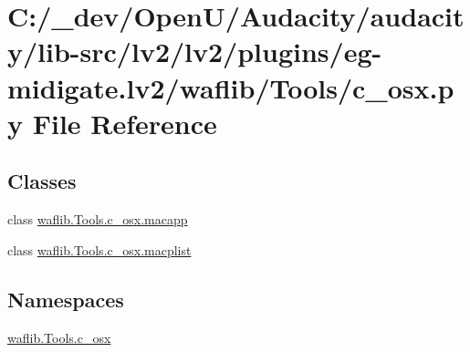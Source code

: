 \hypertarget{lv2_2plugins_2eg-midigate_8lv2_2waflib_2_tools_2c__osx_8py}{}\section{C\+:/\+\_\+dev/\+Open\+U/\+Audacity/audacity/lib-\/src/lv2/lv2/plugins/eg-\/midigate.lv2/waflib/\+Tools/c\+\_\+osx.py File Reference}
\label{lv2_2plugins_2eg-midigate_8lv2_2waflib_2_tools_2c__osx_8py}
\subsection*{Classes}
\begin{DoxyCompactItemize}
\item 
class \hyperlink{classwaflib_1_1_tools_1_1c__osx_1_1macapp}{waflib.\+Tools.\+c\+\_\+osx.\+macapp}
\item 
class \hyperlink{classwaflib_1_1_tools_1_1c__osx_1_1macplist}{waflib.\+Tools.\+c\+\_\+osx.\+macplist}
\end{DoxyCompactItemize}
\subsection*{Namespaces}
\begin{DoxyCompactItemize}
\item 
 \hyperlink{namespacewaflib_1_1_tools_1_1c__osx}{waflib.\+Tools.\+c\+\_\+osx}
\end{DoxyCompactItemize}

